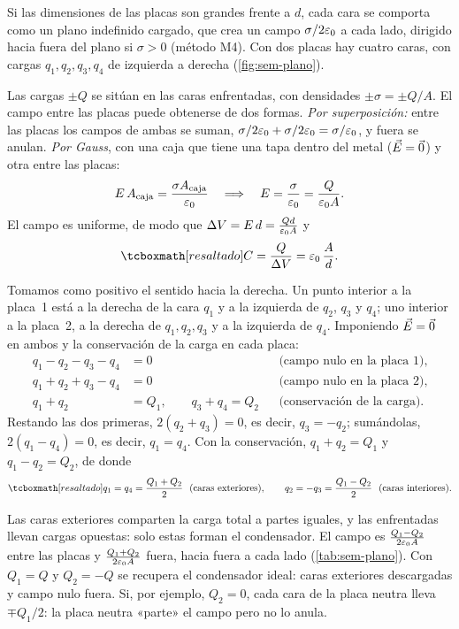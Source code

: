 \begin{resolucion}
 Si las dimensiones de las placas son grandes frente a $d$, cada cara se comporta como un plano indefinido cargado, que crea un campo
$\sigma/2\varepsilon_{0}$ a cada lado, dirigido hacia fuera del plano si $\sigma>0$ (método M4). Con dos placas hay cuatro caras, con cargas $q_1,q_2,q_3,q_4$ de
izquierda a derecha (\cref{fig:sem-plano}).

 Las cargas $\pm Q$ se sitúan en las caras enfrentadas, con densidades $\pm\sigma=\pm Q/A$. El campo entre las
placas puede obtenerse de dos formas. \emph{Por superposición:} entre las placas los campos de ambas se suman, $\sigma/2\varepsilon_{0}+\sigma/2\varepsilon_{0}=\sigma/\varepsilon_{0}$, y fuera se
anulan. \emph{Por Gauss}, con una caja que tiene una tapa dentro del metal ($\vec{E}=\vec{0}$) y otra entre las placas:
\[
  E\,A_{\mathrm{caja}}=\frac{\sigma A_{\mathrm{caja}}}{\varepsilon_{0}}\quad\Longrightarrow\quad E=\frac{\sigma}{\varepsilon_{0}}=\frac{Q}{\varepsilon_{0} A}.
\]
El campo es uniforme, de modo que $\Delta V=E\,d=\frac{Qd}{\varepsilon_{0} A}$ y
\[
  \resalta{C=\frac{Q}{\DV}=\eo\,\frac{A}{d} .}
\]

 Tomamos como positivo el sentido hacia la derecha. Un punto interior a la placa~1 está a la derecha de la cara
$q_1$ y a la izquierda de $q_2$, $q_3$ y $q_4$; uno interior a la placa~2, a la derecha de $q_1,q_2,q_3$ y a la izquierda de $q_4$. Imponiendo $\vec{E}=\vec{0}$ en
ambos y la conservación de la carga en cada placa:
\[
  \begin{aligned}
    q_1-q_2-q_3-q_4&=0 &&\text{(campo nulo en la placa 1)},\\
    q_1+q_2+q_3-q_4&=0 &&\text{(campo nulo en la placa 2)},\\
    q_1+q_2&=Q_1,\qquad q_3+q_4=Q_2 &&\text{(conservación de la carga)}.
  \end{aligned}
\]
Restando las dos primeras, $2(q_2+q_3)=0$, es decir, $q_3=-q_2$; sumándolas, $2(q_1-q_4)=0$, es decir, $q_1=q_4$. Con la conservación,
$q_1+q_2=Q_1$ y $q_1-q_2=Q_2$, de donde
\[
  \resalta{q_1=q_4=\frac{Q_1+Q_2}{2}\ \ \text{(caras exteriores)},\qquad q_2=-q_3=\frac{Q_1-Q_2}{2}\ \ \text{(caras interiores)}.}
\]
\end{resolucion}



\begin{observacion}[Interpretación]\label{obs:sem-plano}
Las caras exteriores comparten la carga total a partes iguales, y las enfrentadas llevan cargas opuestas: solo estas forman el condensador. El campo es
$\frac{Q_1-Q_2}{2\varepsilon_{0} A}$ entre las placas y $\frac{Q_1+Q_2}{2\varepsilon_{0} A}$ fuera, hacia fuera a cada lado (\cref{tab:sem-plano}). Con $Q_1=Q$ y $Q_2=-Q$ se recupera el
condensador ideal: caras exteriores descargadas y campo nulo fuera. Si, por ejemplo, $Q_2=0$, cada cara de la placa neutra lleva $\mp Q_1/2$: la placa neutra
«parte» el campo pero no lo anula.
\end{observacion}

